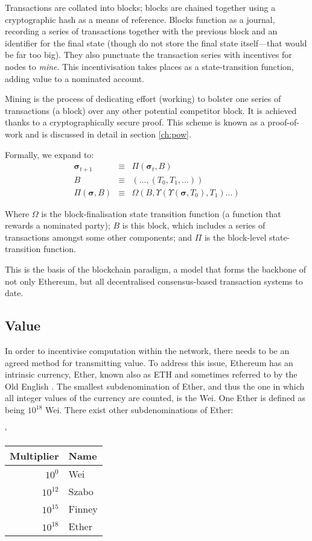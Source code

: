 \documentclass[9pt,oneside]{amsart}
\begin{document}
\begin{multicols}{2}
Transactions are collated into blocks; blocks are chained together using a cryptographic hash as a means of reference. Blocks function as a journal, recording a series of transactions together with the previous block and an identifier for the final state (though do not store the final state itself---that would be far too big). They also punctuate the transaction series with incentives for nodes to \textit{mine}. This incentivisation takes places as a state-transition function, adding value to a nominated account.

Mining is the process of dedicating effort (working) to bolster one series of transactions (a block) over any other potential competitor block. It is achieved thanks to a cryptographically secure proof. This scheme is known as a proof-of-work and is discussed in detail in section \ref{ch:pow}.

Formally, we expand to:
\begin{eqnarray}
\boldsymbol{\sigma}_{t+1} & \equiv & \Pi(\boldsymbol{\sigma}_t, B) \\
B & \equiv & (..., (T_0, T_1, ...) ) \\
\Pi(\boldsymbol{\sigma}, B) & \equiv & \Omega(B, \Upsilon(\Upsilon(\boldsymbol{\sigma}, T_0), T_1) ...)
\end{eqnarray}

Where $\Omega$ is the block-finalisation state transition function (a function that rewards a nominated party); $B$ is this block, which includes a series of transactions amongst some other components; and $\Pi$ is the block-level state-transition function.

This is the basis of the blockchain paradigm, a model that forms the backbone of not only Ethereum, but all decentralised consensus-based transaction systems to date.

\subsection{Value}

In order to incentivise computation within the network, there needs to be an agreed method for transmitting value. To address this issue, Ethereum has an intrinsic currency, Ether, known also as {\small ETH} and sometimes referred to by the Old English \DH{}. The smallest subdenomination of Ether, and thus the one in which all integer values of the currency are counted, is the Wei. One Ether is defined as being $10^{18}$ Wei. There exist other subdenominations of Ether:
\par`
\begin{center}
\begin{tabular}{rl}
\toprule
Multiplier & Name \\
\midrule
$10^0$ & Wei \\
$10^{12}$ & Szabo \\
$10^{15}$ & Finney \\
$10^{18}$ & Ether \\
\bottomrule
\end{tabular}
\end{center}
\par


\end{multicols}
\end{document}
